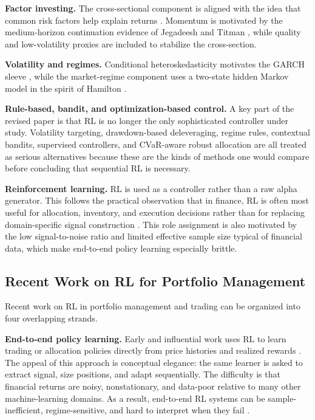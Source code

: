 \documentclass[10pt,twocolumn]{article}
\begin{document}
\textbf{Factor investing.} The cross-sectional component is aligned with the idea
that common risk factors help explain returns \cite{fama1993}. Momentum is
motivated by the medium-horizon continuation evidence of Jegadeesh and Titman
\cite{jegadeesh1993}, while quality and low-volatility proxies are included to
stabilize the cross-section.

\textbf{Volatility and regimes.} Conditional heteroskedasticity motivates the
GARCH sleeve \cite{engle1982,bollerslev1986}, while the market-regime component
uses a two-state hidden Markov model in the spirit of Hamilton \cite{hamilton1989}.

\textbf{Rule-based, bandit, and optimization-based control.} A key part of the
revised paper is that RL is no longer the only sophisticated controller under
study. Volatility targeting, drawdown-based deleveraging, regime rules,
contextual bandits, supervised controllers, and CVaR-aware robust allocation
are all treated as serious alternatives because these are the kinds of methods
one would compare before concluding that sequential RL is necessary.

\textbf{Reinforcement learning.} RL is used as a controller rather than a raw
alpha generator. This follows the practical observation that in finance, RL is
often most useful for allocation, inventory, and execution decisions rather than
for replacing domain-specific signal construction \cite{sutton2018,almgren2000}.
This role assignment is also motivated by the low signal-to-noise ratio and
limited effective sample size typical of financial data, which make end-to-end
policy learning especially brittle.

\subsection{Recent Work on RL for Portfolio Management}

Recent work on RL in portfolio management and trading can be organized into four
overlapping strands.

\textbf{End-to-end policy learning.} Early and influential work uses RL to learn
trading or allocation policies directly from price histories and realized
rewards \cite{moody2001,deng2017,jiang2017,zhang2020,cong2021,pacheco2023}. The appeal of
this approach is conceptual elegance: the same learner is asked to extract
signal, size positions, and adapt sequentially. The difficulty is that
financial returns are noisy, nonstationary, and data-poor relative to many
other machine-learning domains. As a result, end-to-end RL systems can be
sample-inefficient, regime-sensitive, and hard to interpret when they fail
\cite{gu2020,kolm2019,jander2025}.
\end{document}
